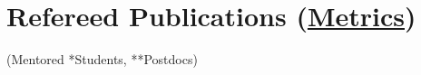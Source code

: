 \section*{Refereed Publications (\href{https://scholar.google.com/citations?user=kaUVku0AAAAJ&hl=fr}{Metrics})}

(Mentored *Students, **Postdocs)
\vspace{1em}



